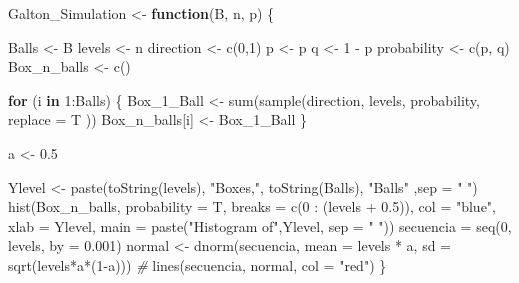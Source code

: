 \documentclass[
]{article}
\newenvironment{Shaded}{\begin{snugshade}}{\end{snugshade}}
\newcommand{\AttributeTok}[1]{\textcolor[rgb]{0.77,0.63,0.00}{#1}}
\newcommand{\CommentTok}[1]{\textcolor[rgb]{0.56,0.35,0.01}{\textit{#1}}}
\newcommand{\ControlFlowTok}[1]{\textcolor[rgb]{0.13,0.29,0.53}{\textbf{#1}}}
\newcommand{\DecValTok}[1]{\textcolor[rgb]{0.00,0.00,0.81}{#1}}
\newcommand{\FloatTok}[1]{\textcolor[rgb]{0.00,0.00,0.81}{#1}}
\newcommand{\FunctionTok}[1]{\textcolor[rgb]{0.00,0.00,0.00}{#1}}
\newcommand{\NormalTok}[1]{#1}
\newcommand{\OtherTok}[1]{\textcolor[rgb]{0.56,0.35,0.01}{#1}}
\newcommand{\SpecialCharTok}[1]{\textcolor[rgb]{0.00,0.00,0.00}{#1}}
\newcommand{\StringTok}[1]{\textcolor[rgb]{0.31,0.60,0.02}{#1}}
\begin{document}
\begin{Shaded}
\begin{Highlighting}[]
\NormalTok{Galton\_Simulation }\OtherTok{\textless{}{-}} \ControlFlowTok{function}\NormalTok{(B, n, p) \{}
  
\NormalTok{  Balls }\OtherTok{\textless{}{-}}\NormalTok{ B}
\NormalTok{  levels }\OtherTok{\textless{}{-}}\NormalTok{ n  }
\NormalTok{  direction }\OtherTok{\textless{}{-}} \FunctionTok{c}\NormalTok{(}\DecValTok{0}\NormalTok{,}\DecValTok{1}\NormalTok{)}
\NormalTok{  p }\OtherTok{\textless{}{-}}\NormalTok{ p  }
\NormalTok{  q }\OtherTok{\textless{}{-}} \DecValTok{1} \SpecialCharTok{{-}}\NormalTok{ p}
\NormalTok{  probability }\OtherTok{\textless{}{-}} \FunctionTok{c}\NormalTok{(p, q)}
\NormalTok{  Box\_n\_balls }\OtherTok{\textless{}{-}} \FunctionTok{c}\NormalTok{()}
  
  \ControlFlowTok{for}\NormalTok{ (i }\ControlFlowTok{in} \DecValTok{1}\SpecialCharTok{:}\NormalTok{Balls) \{}
\NormalTok{    Box\_1\_Ball }\OtherTok{\textless{}{-}} \FunctionTok{sum}\NormalTok{(}\FunctionTok{sample}\NormalTok{(direction, levels, probability, }\AttributeTok{replace =}\NormalTok{ T ))}
\NormalTok{    Box\_n\_balls[i] }\OtherTok{\textless{}{-}}\NormalTok{ Box\_1\_Ball }
\NormalTok{  \}}
  
\NormalTok{  a }\OtherTok{\textless{}{-}} \FloatTok{0.5}
  
\NormalTok{  Ylevel }\OtherTok{\textless{}{-}} \FunctionTok{paste}\NormalTok{(}\FunctionTok{toString}\NormalTok{(levels), }\StringTok{"Boxes,"}\NormalTok{, }\FunctionTok{toString}\NormalTok{(Balls), }\StringTok{"Balls"}\NormalTok{ ,}\AttributeTok{sep =} \StringTok{" "}\NormalTok{)}
  \FunctionTok{hist}\NormalTok{(Box\_n\_balls, }\AttributeTok{probability =}\NormalTok{ T, }\AttributeTok{breaks =} \FunctionTok{c}\NormalTok{(}\DecValTok{0} \SpecialCharTok{:}\NormalTok{ (levels }\SpecialCharTok{+} \FloatTok{0.5}\NormalTok{)), }
       \AttributeTok{col =} \StringTok{"blue"}\NormalTok{, }
       \AttributeTok{xlab =}\NormalTok{ Ylevel, }
       \AttributeTok{main =} \FunctionTok{paste}\NormalTok{(}\StringTok{"Histogram of"}\NormalTok{,Ylevel, }\AttributeTok{sep =} \StringTok{" "}\NormalTok{))}
\NormalTok{  secuencia }\OtherTok{=} \FunctionTok{seq}\NormalTok{(}\DecValTok{0}\NormalTok{, levels, }\AttributeTok{by =} \FloatTok{0.001}\NormalTok{)            }
\NormalTok{  normal }\OtherTok{\textless{}{-}} \FunctionTok{dnorm}\NormalTok{(secuencia, }\AttributeTok{mean =}\NormalTok{ levels }\SpecialCharTok{*}\NormalTok{ a, }\AttributeTok{sd =} \FunctionTok{sqrt}\NormalTok{(levels}\SpecialCharTok{*}\NormalTok{a}\SpecialCharTok{*}\NormalTok{(}\DecValTok{1}\SpecialCharTok{{-}}\NormalTok{a))) }\CommentTok{\#}
  \FunctionTok{lines}\NormalTok{(secuencia, normal, }\AttributeTok{col =} \StringTok{"red"}\NormalTok{)}
\NormalTok{\}}
\end{Highlighting}
\end{Shaded}
\end{document}
